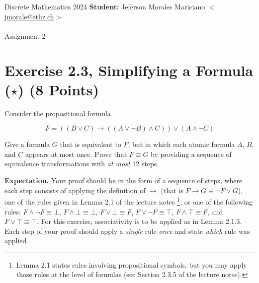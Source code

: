 \documentclass[unicode,11pt,a4paper,oneside,numbers=endperiod,openany]{scrartcl}
\begin{document}
\setassignment
{}

\serieheader
{Discrete Mathematics}
{2024}
{%
\textbf{Student:} Jeferson Morales Mariciano 
\href{mailto:jmorale@ethz.ch}{\(<\)jmorale@ethz.ch\(>\)} \\\\}
{\vspace{-1cm}}%
{Assignment 2}{}

\section{Exercise 2.3, Simplifying a Formula (\(\star\)) \hfill (8 Points)}

Consider the propositional formula

\[
F = \left( (B \lor C) \to ((A \lor \neg B) \land C) \right) \lor (A \land \neg C)
\]

\noindent Give a formula \( G \) that is equivalent to \( F \), but in which each atomic formula \( A \), \( B \), and \( C \)
appears at most once. Prove that \( F \equiv G \) by providing a sequence of equivalence transformations 
with \textit{at most} 12 steps.

\noindent \textbf{Expectation.} 
Your proof should be in the form of a sequence of steps, where each step
consists of applying the definition of \( \to \) 
(that is \( F \to G \equiv \neg F \lor G \)), 
one of the rules given in Lemma 2.1 of the lecture notes 
\footnote{Lemma 2.1 states rules involving propositional symbols, 
but you may apply those rules at the level of formulas 
(see Section 2.3.5 of the lecture notes).}, 
or one of the following rules: 
\( F \land \neg F \equiv \bot \), 
\( F \land \bot \equiv \bot \), 
\( F \lor \bot \equiv F \), 
\( F \lor \neg F \equiv \top \), 
\( F \land \top \equiv F \), 
and \( F \lor \top \equiv \top \). 
For this exercise, associativity is to be applied as in Lemma 2.1.3. 
Each step of your proof should apply a \textit{single} rule \textit{once} 
and state \textit{which} rule was applied.





\end{document}
